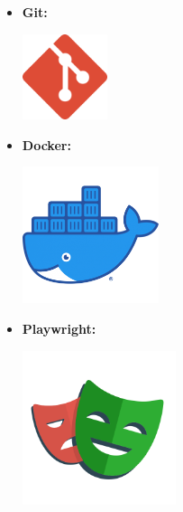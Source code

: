 \begin{itemize}
    \item \textbf{Git:} \newline
          \begin{minipage}{\linewidth}
              \centering
              \includegraphics[width=2.5cm]{src/assets/logos/git_512x512.png}
          \end{minipage}
    \item \textbf{Docker:} \newline
          \begin{minipage}{\linewidth}
              \centering
              \includegraphics[width=4cm]{src/assets/logos/docker_512x512.png}
          \end{minipage}
    \item \textbf{Playwright:} \newline
          \begin{minipage}{\linewidth}
              \centering
              \includegraphics[width=4.5cm]{src/assets/logos/playwright_512x512.png}
          \end{minipage}


\end{itemize}
